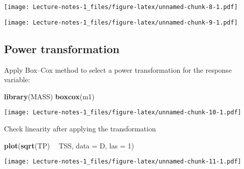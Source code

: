 \documentclass[
]{book}
\newenvironment{Shaded}{\begin{snugshade}}{\end{snugshade}}
\newcommand{\DataTypeTok}[1]{\textcolor[rgb]{0.13,0.29,0.53}{#1}}
\newcommand{\DecValTok}[1]{\textcolor[rgb]{0.00,0.00,0.81}{#1}}
\newcommand{\KeywordTok}[1]{\textcolor[rgb]{0.13,0.29,0.53}{\textbf{#1}}}
\newcommand{\NormalTok}[1]{#1}
\newcommand{\OperatorTok}[1]{\textcolor[rgb]{0.81,0.36,0.00}{\textbf{#1}}}
\newcommand{\OtherTok}[1]{\textcolor[rgb]{0.56,0.35,0.01}{#1}}
\newcommand{\StringTok}[1]{\textcolor[rgb]{0.31,0.60,0.02}{#1}}
\begin{document}
\texttt{[image: Lecture-notes-1\_files/figure-latex/unnamed-chunk-8-1.pdf]}

\begin{Shaded}
\end{Shaded}

\texttt{[image: Lecture-notes-1\_files/figure-latex/unnamed-chunk-9-1.pdf]}

\hypertarget{power-transformation}{%
\subsection{Power transformation}\label{power-transformation}}

Apply Box--Cox method to select a power transformation for the response variable:

\begin{Shaded}
\begin{Highlighting}[]
\KeywordTok{library}\NormalTok{(MASS)}
\KeywordTok{boxcox}\NormalTok{(m1)}
\end{Highlighting}
\end{Shaded}

\texttt{[image: Lecture-notes-1\_files/figure-latex/unnamed-chunk-10-1.pdf]}

Check linearity after applying the transformation

\begin{Shaded}
\begin{Highlighting}[]
\KeywordTok{plot}\NormalTok{(}\KeywordTok{sqrt}\NormalTok{(TP) }\OperatorTok{~}\StringTok{ }\NormalTok{TSS, }\DataTypeTok{data =}\NormalTok{ D, }\DataTypeTok{las =} \DecValTok{1}\NormalTok{)}
\end{Highlighting}
\end{Shaded}

\texttt{[image: Lecture-notes-1\_files/figure-latex/unnamed-chunk-11-1.pdf]}
\end{document}
